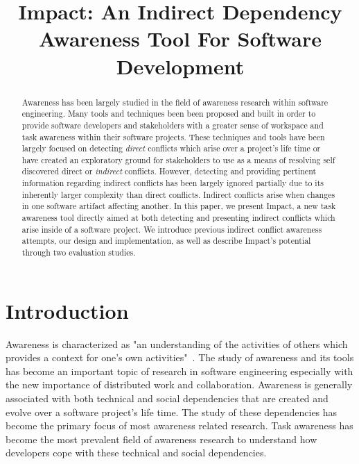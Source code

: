 \documentclass[conference]{IEEEtran}
\begin{document}
\title{Impact: An Indirect Dependency Awareness Tool For Software Development}

\author{
\and
{}
}

\maketitle

\begin{abstract}
Awareness has been largely studied in the field of awareness research within
software engineering. Many tools and techniques been been proposed and built
in order to provide software developers and stakeholders with a greater
sense of workspace and task awareness within their software projects. These
techniques and tools have been largely focused on detecting \textit{direct} 
conflicts which arise over a project's life time or have created 
an exploratory ground for stakeholders to use as a means of resolving self
discovered direct or \textit{indirect} conflicts. However, detecting 
and providing pertinent information regarding indirect conflicts has been
largely ignored partially due to its inherently larger
complexity than direct conflicts. Indirect conflicts arise when changes
in one software artifact affecting another. In this paper, we present
Impact, a new task awareness tool directly aimed at both detecting
and presenting indirect conflicts which arise inside of a software project.
We introduce previous indirect conflict awareness attempts, our design 
and implementation, as well as describe Impact's potential through
two evaluation studies. 
\end{abstract}


\section{Introduction}
Awareness is characterized as "an understanding of the activities of others
which provides a context for one's own activities"~\cite{Dourish:1992:ACS}.
The study of awareness and its tools has become an important topic of
research in software engineering especially with the new importance of
distributed work and collaboration. Awareness is generally associated with
both technical and social dependencies that are created and evolve over
a software project's life time. The study of these dependencies has become
the primary focus of most awareness related research. Task awareness has
become the most prevalent field of awareness research to understand 
how developers cope with these technical and social dependencies.\\
\end{document}

